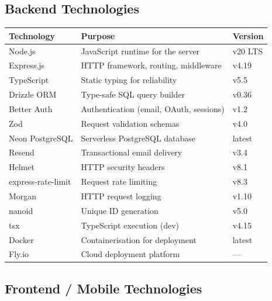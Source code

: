 \documentclass[12pt,a4paper]{article}
\begin{document}
\subsection{Backend Technologies}

\vspace{4pt}
\begin{center}
\renewcommand{\arraystretch}{1.35}
\begin{tabular}{@{} L{3.6cm} L{7.2cm} L{2.6cm} @{}}
\toprule
{}
\textbf{Technology} & \textbf{Purpose} & \textbf{Version} \\
\midrule
Node.js              & JavaScript runtime for the server             & v20 LTS \\
Express.js           & HTTP framework, routing, middleware            & v4.19 \\
TypeScript           & Static typing for reliability                  & v5.5 \\
Drizzle ORM          & Type-safe SQL query builder                    & v0.36 \\
Better Auth          & Authentication (email, OAuth, sessions)        & v1.2 \\
Zod                  & Request validation schemas                     & v4.0 \\
Neon PostgreSQL      & Serverless PostgreSQL database                 & latest \\
Resend               & Transactional email delivery                   & v3.4 \\
Helmet               & HTTP security headers                          & v8.1 \\
express-rate-limit   & Request rate limiting                          & v8.3 \\
Morgan               & HTTP request logging                           & v1.10 \\
nanoid               & Unique ID generation                           & v5.0 \\
tsx                  & TypeScript execution (dev)                     & v4.15 \\
Docker               & Containerisation for deployment                & latest \\
Fly.io               & Cloud deployment platform                      & --- \\
\bottomrule
\end{tabular}
\end{center}

\subsection{Frontend / Mobile Technologies}
\end{document}

